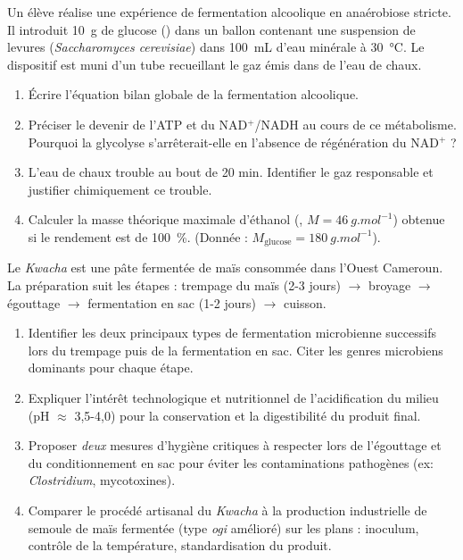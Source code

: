 \documentclass[11pt]{article}
\begin{document}
\begin{exercice}
Un élève réalise une expérience de fermentation alcoolique en anaérobiose stricte. Il introduit \SI{10}{g} de glucose () dans un ballon contenant une suspension de levures (\textit{Saccharomyces cerevisiae}) dans \SI{100}{mL} d'eau minérale à \SI{30}{\celsius}. Le dispositif est muni d'un tube recueillant le gaz émis dans de l'eau de chaux.
\begin{enumerate}
    \item Écrire l'équation bilan globale de la fermentation alcoolique.
    \item Préciser le devenir de l'ATP et du NAD$^+$/NADH au cours de ce métabolisme. Pourquoi la glycolyse s'arrêterait-elle en l'absence de régénération du NAD$^+$ ?
    \item L'eau de chaux trouble au bout de 20 min. Identifier le gaz responsable et justifier chimiquement ce trouble.
    \item Calculer la masse théorique maximale d'éthanol (, $M = \SI{46}{g.mol^{-1}}$) obtenue si le rendement est de \SI{100}{\%}. (Donnée : $M_{\text{glucose}} = \SI{180}{g.mol^{-1}}$).
\end{enumerate}
\end{exercice}

\begin{exercice}
Le \textit{Kwacha} est une pâte fermentée de maïs consommée dans l'Ouest Cameroun. La préparation suit les étapes : trempage du maïs (2-3 jours) $\rightarrow$ broyage $\rightarrow$ égouttage $\rightarrow$ fermentation en sac (1-2 jours) $\rightarrow$ cuisson.
\begin{enumerate}
    \item Identifier les deux principaux types de fermentation microbienne successifs lors du trempage puis de la fermentation en sac. Citer les genres microbiens dominants pour chaque étape.
    \item Expliquer l'intérêt technologique et nutritionnel de l'acidification du milieu (pH $\approx$ 3,5-4,0) pour la conservation et la digestibilité du produit final.
    \item Proposer \textit{deux} mesures d'hygiène critiques à respecter lors de l'égouttage et du conditionnement en sac pour éviter les contaminations pathogènes (ex: \textit{Clostridium}, mycotoxines).
    \item Comparer le procédé artisanal du \textit{Kwacha} à la production industrielle de semoule de maïs fermentée (type \textit{ogi} amélioré) sur les plans : inoculum, contrôle de la température, standardisation du produit.
\end{enumerate}
\end{exercice}
\end{document}
